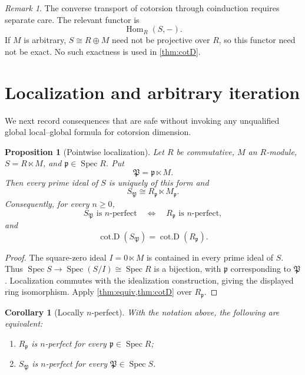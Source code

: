 \documentclass[11pt,reqno]{amsart}
\newcommand{\cotD}{\operatorname{cot.D}}
\newcommand{\Spec}{\operatorname{Spec}}
\theoremstyle{plain}
\newtheorem{proposition}[proposition]{Proposition}
\newtheorem{corollary}[corollary]{Corollary}
\theoremstyle{definition}
\theoremstyle{remark}
\newtheorem{remark}[remark]{Remark}
\begin{document}
\begin{remark}\label{rem:coinduction-warning}
The converse transport of cotorsion through coinduction requires separate care.
The relevant functor is
\[
  \operatorname{Hom}_R(S,-).
\]
If $M$ is arbitrary, $S\cong R\oplus M$ need not be projective over $R$, so
this functor need not be exact.  No such exactness is used in
\cref{thm:cotD}.
\end{remark}

\section{Localization and arbitrary iteration}

We next record consequences that are safe without invoking any unqualified global
local--global formula for cotorsion dimension.

\begin{proposition}[Pointwise localization]\label{prop:local}
Let $R$ be commutative, $M$ an $R$-module, $S=R\ltimes M$, and
$\mathfrak p\in\Spec R$.  Put
\[
  \mathfrak P=\mathfrak p\ltimes M.
\]
Then every prime ideal of $S$ is uniquely of this form and
\[
  S_{\mathfrak P}\cong R_{\mathfrak p}\ltimes M_{\mathfrak p}.
\]
Consequently, for every $n\ge0$,
\[
  S_{\mathfrak P}\text{ is }n\text{-perfect}
  \quad\Longleftrightarrow\quad
  R_{\mathfrak p}\text{ is }n\text{-perfect},
\]
and
\[
  \cotD(S_{\mathfrak P})=\cotD(R_{\mathfrak p}).
\]
\end{proposition}

\begin{proof}
The square-zero ideal $I=0\ltimes M$ is contained in every prime ideal of $S$.
Thus $\Spec S\to\Spec(S/I)\cong\Spec R$ is a bijection, with
$\mathfrak p$ corresponding to $\mathfrak P$.  Localization commutes with the
idealization construction, giving the displayed ring isomorphism.  Apply
\cref{thm:equiv,thm:cotD} over $R_{\mathfrak p}$.
\end{proof}

\begin{corollary}[Locally $n$-perfect]\label{cor:locally}
With the notation above, the following are equivalent:
\begin{enumerate}[label=\textup{(\roman*)}]
\item $R_{\mathfrak p}$ is $n$-perfect for every $\mathfrak p\in\Spec R$;
\item $S_{\mathfrak P}$ is $n$-perfect for every $\mathfrak P\in\Spec S$.
\end{enumerate}
\end{corollary}
\end{document}

